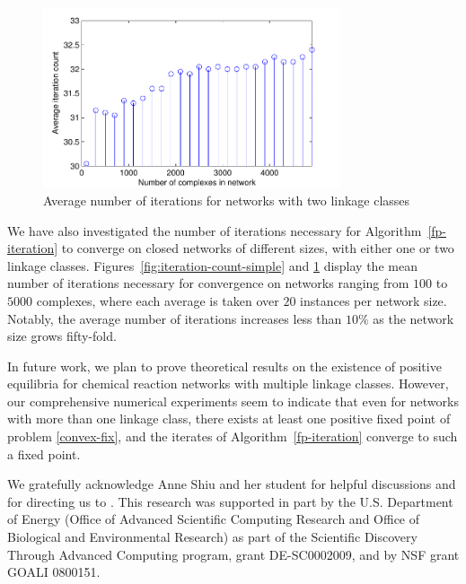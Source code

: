 \documentclass[smallextended]{svjour3}       %
\newcommand*{\0}{\mathbf{0}}
\newcommand*{\1}{\mathbf{1}}
\begin{document}
\begin{figure}%
   \centering
   \includegraphics[width=0.78\textwidth]{MultipleNetAvgIterationsVsNetSize} 
   \caption{Average number of iterations for networks with two linkage
            classes}
   \label{fig:iteration-count-multiple} 
\end{figure}


We have also investigated the number of iterations necessary for
Algorithm~\ref{fp-iteration} to converge on closed networks of different
sizes, with either one or two linkage classes.
Figures~\ref{fig:iteration-count-simple} and
\ref{fig:iteration-count-multiple} display the mean number of
iterations necessary for convergence on networks ranging from $100$ to
$5000$ complexes, where each average is taken over $20$ instances per
network size. Notably, the average number of iterations increases less
than $10\%$ as the network size grows fifty-fold.

In future work, we plan to prove theoretical results on the existence of
positive equilibria for chemical reaction networks with multiple
linkage classes.  However, our comprehensive numerical experiments
seem to indicate that even for networks with more than one linkage
class, there exists at least one positive fixed point of problem
\eqref{convex-fix}, and the iterates of Algorithm~\ref{fp-iteration} converge
to such a fixed point.


\enlargethispage{3\baselineskip}

\begin{acknowledgements}
We gratefully acknowledge Anne Shiu and her student for helpful
discussions and for directing us to \cite{Deng}.
This research was supported in part by the U.S. Department of Energy (Office
of Advanced Scientific Computing Research and Office of Biological
and Environmental Research) as part of the Scientific Discovery
Through Advanced Computing program, grant DE-SC0002009,
and by NSF grant GOALI 0800151.
\end{acknowledgements}

\frenchspacing
 
{}
\end{document}
